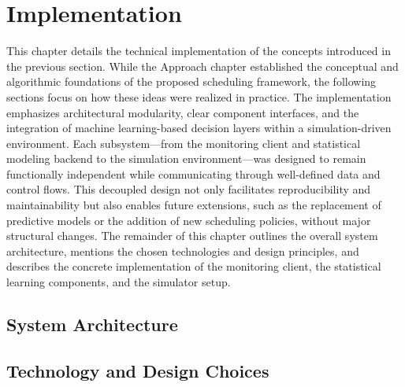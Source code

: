 \section{Implementation}
\label{cha:implementation}
This chapter details the technical implementation of the concepts introduced in the previous section. While the Approach chapter established the conceptual and algorithmic foundations of the proposed scheduling framework, the following sections focus on how these ideas were realized in practice. The implementation emphasizes architectural modularity, clear component interfaces, and the integration of machine learning-based decision layers within a simulation-driven environment. Each subsystem—from the monitoring client and statistical modeling backend to the simulation environment—was designed to remain functionally independent while communicating through well-defined data and control flows. This decoupled design not only facilitates reproducibility and maintainability but also enables future extensions, such as the replacement of predictive models or the addition of new scheduling policies, without major structural changes. The remainder of this chapter outlines the overall system architecture, mentions the chosen technologies and design principles, and describes the concrete implementation of the monitoring client, the statistical learning components, and the simulator setup.

\subsection{System Architecture}
\label{sec:system_architecture}


\subsection{Technology and Design Choices}
\label{sec:technology_and_design_choices}


